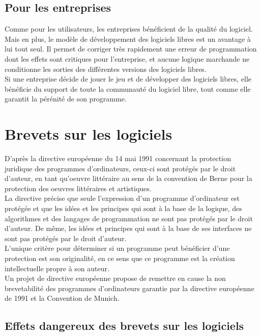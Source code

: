 \documentclass{article}
\begin{document}
\subsection{Pour les entreprises}
Comme pour les utilisateurs, les entreprises bénéficient de la qualité du logiciel. Mais en plus, le modèle de développement des logiciels libres est un avantage à lui tout seul. Il permet de corriger très rapidement une erreur de programmation dont les effets sont critiques pour l'entreprise, et aucune logique marchande ne conditionne les sorties des différentes versions des logiciels libres. \vspace{5mm} \\
Si une entreprise décide de jouer le jeu et de développer des logiciels libres, elle bénéficie du support de toute la communauté du logiciel libre, tout comme elle garantit la pérénité de son programme.

\newpage

\section{Brevets sur les logiciels}
D'après la directive européenne du 14 mai 1991 concernant la protection juridique des programmes d'ordinateurs, ceux-ci sont protégés par le droit d'auteur, en tant qu'oeuvre littéraire au sens de la convention de Berne pour la protection des oeuvres littéraires et artistiques. \vspace{5mm} \\
La directive précise que seule l'expression d'un programme d'ordinateur est protégée et que les idées et les principes qui sont à la base de la logique, des algorithmes et des langages de programmation ne sont pas protégés par le droit d'auteur. De même, les idées et principes qui sont à la base de ses interfaces ne sont pas protégés par le droit d'auteur. \vspace{5mm} \\
L'unique critère pour déterminer si un programme peut bénéficier d'une protection est son originalité, en ce sens que ce programme est la création intellectuelle propre à son auteur. \vspace{5mm} \\
Un projet de directive européenne propose de remettre en cause la non brevetabilité des programmes d'ordinateurs garantie par la directive européenne de 1991 et la Convention de Munich.

\subsection{Effets dangereux des brevets sur les logiciels}
\end{document}
